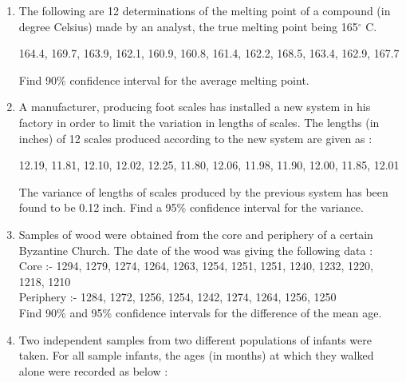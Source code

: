 \documentclass[11pt, a4paper]{article}
\begin{document}
\begin{enumerate}

\item The following are 12 determinations of the melting point of a compound (in degree Celsius) made by an analyst, the true melting point being 165$^\circ{}$ C.

\begin{center}
164.4, 169.7, 163.9, 162.1, 160.9, 160.8, 161.4, 162.2, 168.5, 163.4, 162.9, 167.7
\end{center}

Find 90\% confidence interval for the average melting point.

\item A manufacturer, producing foot scales has installed a new system in his factory in order to limit the variation in lengths of scales. The lengths (in inches) of 12 scales produced according to the new system are given as :

	\begin{center}
		12.19, 11.81, 12.10, 12.02, 12.25, 11.80, 12.06, 11.98, 11.90, 12.00, 11.85, 12.01
	\end{center}

The variance of lengths of scales produced by the previous system has been found to be 0.12 inch. Find a 95\% confidence interval for the variance.






\item Samples of wood were obtained from the core and periphery of a certain Byzantine Church. The date of the wood was giving the following data : \\


Core :- 1294, 1279, 1274, 1264, 1263, 1254, 1251, 1251, 1240, 1232, 1220, 1218, 1210 \\

Periphery :- 1284, 1272, 1256, 1254, 1242, 1274, 1264, 1256, 1250 \\



Find 90\% and 95\% confidence intervals for the difference of the mean age.












\item Two independent samples from two different populations of infants were taken. For all sample infants, the ages (in months) at which they walked alone were recorded as below : \\


\end{enumerate}
\end{document}
